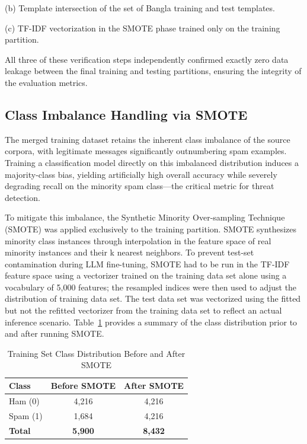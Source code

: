 \documentclass[journal]{IEEEtran}
\begin{document}
(b) Template intersection of the set of Bangla training and test
templates.

(c) TF-IDF vectorization in the SMOTE phase trained only on the
training partition.

All three of these verification steps independently confirmed exactly zero data leakage between the final training and testing partitions, ensuring the integrity of the evaluation metrics.

\subsection{Class Imbalance Handling via SMOTE}

The merged training dataset retains the inherent class imbalance of the source corpora, with legitimate messages significantly outnumbering spam examples. Training a classification model directly on this imbalanced distribution induces a majority-class bias, yielding artificially high overall accuracy while severely degrading recall on the minority spam class---the critical metric for threat detection.

To mitigate this imbalance, the Synthetic Minority Over-sampling Technique (SMOTE) was applied exclusively to the training partition.
SMOTE synthesizes minority class instances through interpolation in the
feature space of real minority instances and their k nearest neighbors.
To prevent test-set contamination during LLM fine-tuning, SMOTE had to be run in the TF-IDF feature space using a vectorizer
trained on the training data set alone using a vocabulary of 5,000
features; the resampled indices were then used to adjust the
distribution of training data set. The test data set was vectorized
using the fitted but not the refitted vectorizer from the training data
set to reflect an actual inference scenario. Table~\ref{tab:smote} provides a summary
of the class distribution prior to and after running SMOTE.

\begin{table}[htbp]
\caption{Training Set Class Distribution Before and After SMOTE}
\label{tab:smote}
\centering
\begin{tabular}{lcc}
\toprule
\textbf{Class} & \textbf{Before SMOTE} & \textbf{After SMOTE} \\
\midrule
Ham (0) & 4,216 & 4,216 \\
Spam (1) & 1,684 & 4,216 \\
\textbf{Total} & \textbf{5,900} & \textbf{8,432} \\
\bottomrule
\end{tabular}
\end{table}
\end{document}
